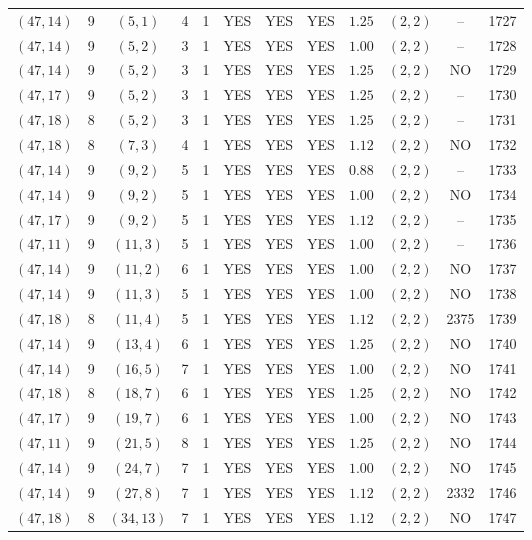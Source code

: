 \begin{longtable}{|c|c|c|c|c|c|c|c|c|c|c|c|}
$(47,14)$ & 9 & $(5,1)$ & 4 & 1 & YES & YES & YES & $1.25$ & $(2,2)$ & -- & 1727\\
$(47,14)$ & 9 & $(5,2)$ & 3 & 1 & YES & YES & YES & $1.00$ & $(2,2)$ & -- & 1728\\
$(47,14)$ & 9 & $(5,2)$ & 3 & 1 & YES & YES & YES & $1.25$ & $(2,2)$ & NO & 1729\\
$(47,17)$ & 9 & $(5,2)$ & 3 & 1 & YES & YES & YES & $1.25$ & $(2,2)$ & -- & 1730\\
$(47,18)$ & 8 & $(5,2)$ & 3 & 1 & YES & YES & YES & $1.25$ & $(2,2)$ & -- & 1731\\
$(47,18)$ & 8 & $(7,3)$ & 4 & 1 & YES & YES & YES & $1.12$ & $(2,2)$ & NO & 1732\\
$(47,14)$ & 9 & $(9,2)$ & 5 & 1 & YES & YES & YES & $0.88$ & $(2,2)$ & -- & 1733\\
$(47,14)$ & 9 & $(9,2)$ & 5 & 1 & YES & YES & YES & $1.00$ & $(2,2)$ & NO & 1734\\
$(47,17)$ & 9 & $(9,2)$ & 5 & 1 & YES & YES & YES & $1.12$ & $(2,2)$ & -- & 1735\\
$(47,11)$ & 9 & $(11,3)$ & 5 & 1 & YES & YES & YES & $1.00$ & $(2,2)$ & -- & 1736\\
$(47,14)$ & 9 & $(11,2)$ & 6 & 1 & YES & YES & YES & $1.00$ & $(2,2)$ & NO & 1737\\
$(47,14)$ & 9 & $(11,3)$ & 5 & 1 & YES & YES & YES & $1.00$ & $(2,2)$ & NO & 1738\\
$(47,18)$ & 8 & $(11,4)$ & 5 & 1 & YES & YES & YES & $1.12$ & $(2,2)$ & 2375 & 1739\\
$(47,14)$ & 9 & $(13,4)$ & 6 & 1 & YES & YES & YES & $1.25$ & $(2,2)$ & NO & 1740\\
$(47,14)$ & 9 & $(16,5)$ & 7 & 1 & YES & YES & YES & $1.00$ & $(2,2)$ & NO & 1741\\
$(47,18)$ & 8 & $(18,7)$ & 6 & 1 & YES & YES & YES & $1.25$ & $(2,2)$ & NO & 1742\\
$(47,17)$ & 9 & $(19,7)$ & 6 & 1 & YES & YES & YES & $1.00$ & $(2,2)$ & NO & 1743\\
$(47,11)$ & 9 & $(21,5)$ & 8 & 1 & YES & YES & YES & $1.25$ & $(2,2)$ & NO & 1744\\
$(47,14)$ & 9 & $(24,7)$ & 7 & 1 & YES & YES & YES & $1.00$ & $(2,2)$ & NO & 1745\\
$(47,14)$ & 9 & $(27,8)$ & 7 & 1 & YES & YES & YES & $1.12$ & $(2,2)$ & 2332 & 1746\\
$(47,18)$ & 8 & $(34,13)$ & 7 & 1 & YES & YES & YES & $1.12$ & $(2,2)$ & NO & 1747\\

\end{longtable}
